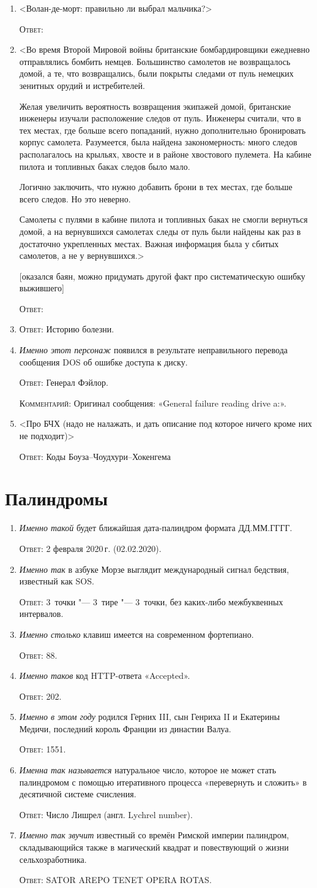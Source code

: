 \documentclass[a4paper,10pt]{article}
\let\keyword\textsc
\newenvironment{topic}{\begin{enumerate}}{\end{enumerate}}
\newcommand{\question}[3]{\item[#1.] #2 \par \keyword{Ответ:} #3}
\newcommand{\commentary}[1]{\par \keyword{Комментарий:} #1}
\newcommand{\additional}{$\Im$}
\begin{document}
\begin{topic}
 \question{10}{<Волан-де-морт: правильно ли выбрал мальчика?>}{}
 \question{20}{<Во время Второй Мировой войны британские бомбардировщики ежедневно отправлялись бомбить немцев. Большинство самолетов не возвращалось домой, а те, что возвращались, были покрыты следами от пуль немецких зенитных орудий и истребителей.

 Желая увеличить вероятность возвращения экипажей домой, британские инженеры изучали расположение следов от пуль. Инженеры считали, что в тех местах, где больше всего попаданий, нужно дополнительно бронировать корпус самолета. Разумеется, была найдена закономерность: много следов располагалось на крыльях, хвосте и в районе хвостового пулемета. На кабине пилота и топливных баках следов было мало.

 Логично заключить, что нужно добавить брони в тех местах, где больше всего следов. Но это неверно.

 Самолеты с пулями в кабине пилота и топливных баках не смогли вернуться домой, а на вернувшихся самолетах следы от пуль были найдены как раз в достаточно укрепленных местах. Важная информация была у сбитых самолетов, а не у вернувшихся.>

 [оказался баян, можно придумать другой факт про систематическую ошибку выжившего]}{}
 \question{30}{<вопрос про одноимённую песню Высоцкого: именно это на самом деле>}{Историю болезни.}
 \question{40}{\emph{Именно этот персонаж} появился в результате неправильного перевода сообщения DOS об ошибке доступа к диску.}{Генерал Фэйлор.}\commentary{Оригинал сообщения: «General failure reading drive a:».}
 \question{50}{<Про БЧХ (надо не налажать, и дать описание под которое ничего кроме них не подходит)>}{Коды Боуза–Чоудхури–Хокенгема}
\end{topic}


\newpage
\section{Палиндромы}

\begin{topic}
 \question{\additional}{\emph{Именно такой} будет ближайшая дата-палиндром формата ДД.ММ.ГГГГ.}{2 февраля 2020\,г. (02.02.2020).}
 \question{\additional}{\emph{Именно так} в азбуке Морзе выглядит международный сигнал бедствия, известный как SOS.}{3~точки "--- 3~тире "--- 3~точки, без каких-либо межбуквенных интервалов.}
 \question{10}{\emph{Именно столько} клавиш имеется на современном фортепиано.}{88.}
 \question{20}{\emph{Именно таков} код HTTP-ответа «Accepted».}{202.}
 \question{30}{\emph{Именно в этом году} родился Герних III, сын Генриха II и Екатерины Медичи, последний король Франции из династии Валуа.}{1551.}
 \question{40}{\emph{Именна так называется} натуральное число, которое не может стать палиндромом с помощью итеративного процесса «перевернуть и сложить» в десятичной системе счисления.}{Число Лишрел (англ. Lychrel number).}
 \question{50}{\emph{Именно так звучит} известный со времён Римской империи палиндром, складывающийся также в магический квадрат и повествующий о жизни сельхозработника.}{SATOR AREPO TENET OPERA ROTAS.}
\end{topic}
\end{document}
